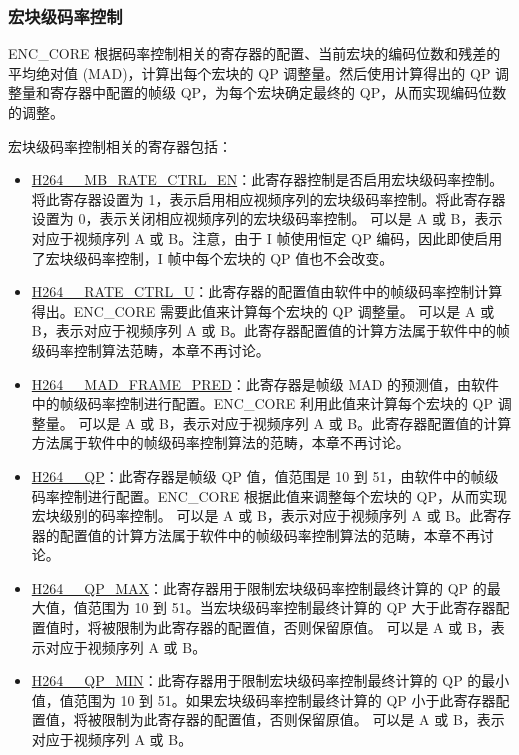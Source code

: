 \documentclass[main\_\_CN.tex]{subfiles}
\begin{document}
\subsubsection{宏块级码率控制}\label{sec:h264-rate-ctrl}
ENC\_CORE 根据码率控制相关的寄存器的配置、当前宏块的编码位数和残差的平均绝对值 (MAD)，计算出每个宏块的 QP 调整量。然后使用计算得出的 QP 调整量和寄存器中配置的帧级 QP，为每个宏块确定最终的 QP，从而实现编码位数的调整。


宏块级码率控制相关的寄存器包括：
\begin{itemize}
    \item \hyperref[fielddesc:H264AMBRATECTRLEN]{H264\_\_MB\_RATE\_CTRL\_EN}：此寄存器控制是否启用宏块级码率控制。将此寄存器设置为 1，表示启用相应视频序列的宏块级码率控制。将此寄存器设置为 0，表示关闭相应视频序列的宏块级码率控制。 可以是 A 或 B，表示对应于视频序列 A 或 B。注意，由于 I 帧使用恒定 QP 编码，因此即使启用了宏块级码率控制，I 帧中每个宏块的 QP 值也不会改变。
    \item \hyperref[fielddesc:H264ARATECTRLU]{H264\_\_RATE\_CTRL\_U}：此寄存器的配置值由软件中的帧级码率控制计算得出。ENC\_CORE 需要此值来计算每个宏块的 QP 调整量。 可以是 A 或 B，表示对应于视频序列 A 或 B。此寄存器配置值的计算方法属于软件中的帧级码率控制算法范畴，本章不再讨论。
    \item \hyperref[fielddesc:H264AMADFRAMEPRED]{H264\_\_MAD\_FRAME\_PRED}：此寄存器是帧级 MAD 的预测值，由软件中的帧级码率控制进行配置。ENC\_CORE 利用此值来计算每个宏块的 QP 调整量。 可以是 A 或 B，表示对应于视频序列 A 或 B。此寄存器配置值的计算方法属于软件中的帧级码率控制算法的范畴，本章不再讨论。
    \item \hyperref[fielddesc:H264AQP]{H264\_\_QP}：此寄存器是帧级 QP 值，值范围是 10 到 51，由软件中的帧级码率控制进行配置。ENC\_CORE 根据此值来调整每个宏块的 QP，从而实现宏块级别的码率控制。 可以是 A 或 B，表示对应于视频序列 A 或 B。此寄存器的配置值的计算方法属于软件中的帧级码率控制算法的范畴，本章不再讨论。
    \item \hyperref[fielddesc:H264AQPMAX]{H264\_\_QP\_MAX}：此寄存器用于限制宏块级码率控制最终计算的 QP 的最大值，值范围为 10 到 51。当宏块级码率控制最终计算的 QP 大于此寄存器配置值时，将被限制为此寄存器的配置值，否则保留原值。 可以是 A 或 B，表示对应于视频序列 A 或 B。
    \item \hyperref[fielddesc:H264AQPMIN]{H264\_\_QP\_MIN}：此寄存器用于限制宏块级码率控制最终计算的 QP 的最小值，值范围为 10 到 51。如果宏块级码率控制最终计算的 QP 小于此寄存器配置值，将被限制为此寄存器的配置值，否则保留原值。 可以是 A 或 B，表示对应于视频序列 A 或 B。

\end{itemize}
\end{document}
